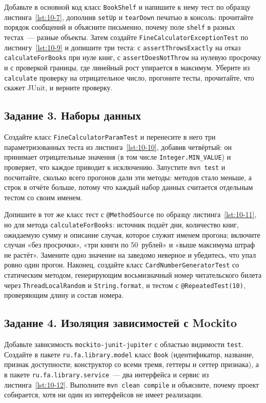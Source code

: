 Добавьте в основной код класс \texttt{BookShelf} и напишите к нему тест по образцу листинга~\ref{lst:10-7}, дополнив \texttt{setUp} и \texttt{tearDown} печатью в консоль: прочитайте порядок сообщений и объясните письменно, почему поле \texttt{shelf} в разных тестах~--- разные объекты. Затем создайте \texttt{FineCalculatorExceptionTest} по листингу~\ref{lst:10-9} и допишите три теста: с \texttt{assertThrowsExactly} на отказ \texttt{calculateForBooks} при нуле книг, с \texttt{assertDoesNotThrow} на нулевую просрочку и с проверкой границы, где линейный рост упирается в максимум. Уберите из \texttt{calculate} проверку на отрицательное число, прогоните тесты, прочитайте, что скажет JUnit, и верните проверку.

\subsection*{Задание 3. Наборы данных}

Создайте класс \texttt{FineCalculatorParamTest} и перенесите в него три параметризованных теста из листинга~\ref{lst:10-10}, добавив четвёртый: он принимает отрицательные значения (в том числе \texttt{Integer.MIN\_VALUE}) и проверяет, что каждое приводит к исключению. Запустите \texttt{mvn test} и посчитайте, сколько всего прогонов дали эти методы: методов стало меньше, а строк в отчёте больше, потому что каждый набор данных считается отдельным тестом со своим именем.

Допишите в тот же класс тест с \texttt{@MethodSource} по образцу листинга~\ref{lst:10-11}, но для метода \texttt{calculateForBooks}: источник подаёт дни, количество книг, ожидаемую сумму и описание случая, которое служит именем прогона; включите случаи «без просрочки», «три книги по 50~рублей» и «выше максимума штраф не растёт». Замените одно значение на заведомо неверное и убедитесь, что упал ровно один прогон. Наконец, создайте класс \texttt{CardNumberGeneratorTest} со статическим методом, генерирующим восьмизначный номер читательского билета через \texttt{ThreadLocalRandom} и \texttt{String.format}, и тестом с \texttt{@RepeatedTest(10)}, проверяющим длину и состав номера.

\subsection*{Задание 4. Изоляция зависимостей с Mockito}

Добавьте зависимость \texttt{mockito-junit-jupiter} с областью видимости \texttt{test}. Создайте в пакете \texttt{ru.fa.library.model} класс \texttt{Book} (идентификатор, название, признак доступности; конструктор со всеми тремя, геттеры и сеттер признака), а в пакете \texttt{ru.fa.library.service}~--- два интерфейса и сервис из листинга~\ref{lst:10-12}. Выполните \texttt{mvn clean compile} и объясните, почему проект собирается, хотя ни один из интерфейсов не имеет реализации.

